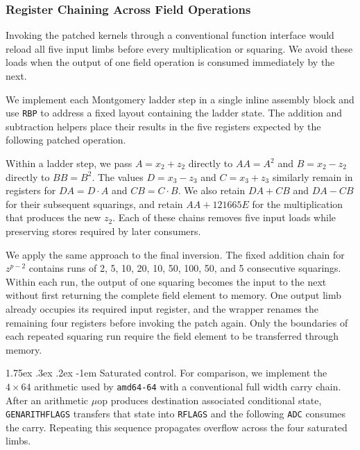 \documentclass[journal=tches,submission]{iacrtrans}
\makeatletter
\newcommand{\code}[1]{\texttt{#1}}
\renewcommand\paragraph{\@startsection{paragraph}{4}{\z@}%
      {1.75ex \@plus .3ex \@minus .2ex}%
      {-1em}%
      {\normalfont\normalsize\bfseries\SS@parafont}}
\makeatother
\begin{document}
\subsubsection{Register Chaining Across Field Operations}
\label{sec:c25519-integration}

Invoking the patched kernels through a conventional function interface would reload all five input limbs before every multiplication or squaring.
We avoid these loads when the output of one field operation is consumed immediately by the next.

We implement each Montgomery ladder step in a single inline assembly block and use \code{RBP} to address a fixed layout containing the ladder state.
The addition and subtraction helpers place their results in the five registers expected by the following patched operation.

Within a ladder step, we pass $A=x_2+z_2$ directly to $AA=A^2$ and $B=x_2-z_2$ directly to $BB=B^2$.
The values $D=x_3-z_3$ and $C=x_3+z_3$ similarly remain in registers for $DA=D\cdot A$ and $CB=C\cdot B$.
We also retain $DA+CB$ and $DA-CB$ for their subsequent squarings, and retain $AA+121665E$ for the multiplication that produces the new $z_2$.
Each of these chains removes five input loads while preserving stores required by later consumers.

We apply the same approach to the final inversion.
The fixed addition chain for $z^{p-2}$ contains runs of 2, 5, 10, 20, 10, 50, 100, 50, and 5 consecutive squarings.
Within each run, the output of one squaring becomes the input to the next without first returning the complete field element to memory.
One output limb already occupies its required input register, and the wrapper renames the remaining four registers before invoking the patch again.
Only the boundaries of each repeated squaring run require the field element to be transferred through memory.

\paragraph{Saturated control.}
For comparison, we implement the $4\times64$ arithmetic used by \texttt{amd64-64} with a conventional full width carry chain.
After an arithmetic $\mu$op produces destination associated conditional state, \code{GENARITHFLAGS} transfers that state into \code{RFLAGS} and the following \code{ADC} consumes the carry.
Repeating this sequence propagates overflow across the four saturated limbs.
\end{document}
